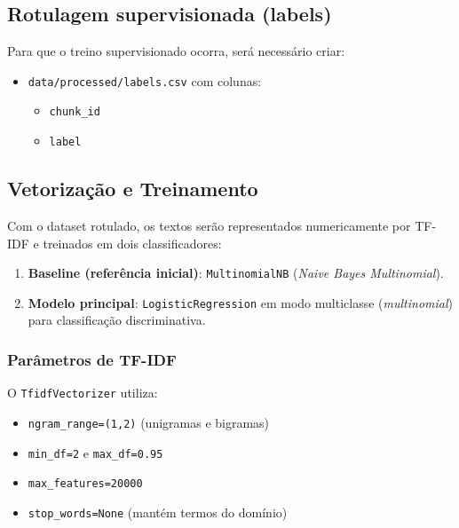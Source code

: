 \subsection{Rotulagem supervisionada (labels)}

Para que o treino supervisionado ocorra, será necessário criar:

\begin{itemize}[leftmargin=1.2cm]
    \item \texttt{data/processed/labels.csv} com colunas:
    \begin{itemize}
        \item \texttt{chunk\_id}
        \item \texttt{label}
    \end{itemize}
\end{itemize}

\subsection{Vetorização e Treinamento}

Com o dataset rotulado, os textos serão representados numericamente por TF-IDF e treinados em dois classificadores:

\begin{enumerate}[leftmargin=1.2cm]
    \item \textbf{Baseline (referência inicial)}: \texttt{MultinomialNB} (\textit{Naive Bayes Multinomial}).
    \item \textbf{Modelo principal}: \texttt{LogisticRegression} em modo multiclasse (\textit{multinomial}) para classificação discriminativa.
\end{enumerate}

\subsubsection{Parâmetros de TF-IDF}

O \texttt{TfidfVectorizer} utiliza:

\begin{itemize}[leftmargin=1.2cm]
    \item \texttt{ngram\_range=(1,2)} (unigramas e bigramas)
    \item \texttt{min\_df=2} e \texttt{max\_df=0.95}
    \item \texttt{max\_features=20000}
    \item \texttt{stop\_words=None} (mantém termos do domínio)
\end{itemize}

